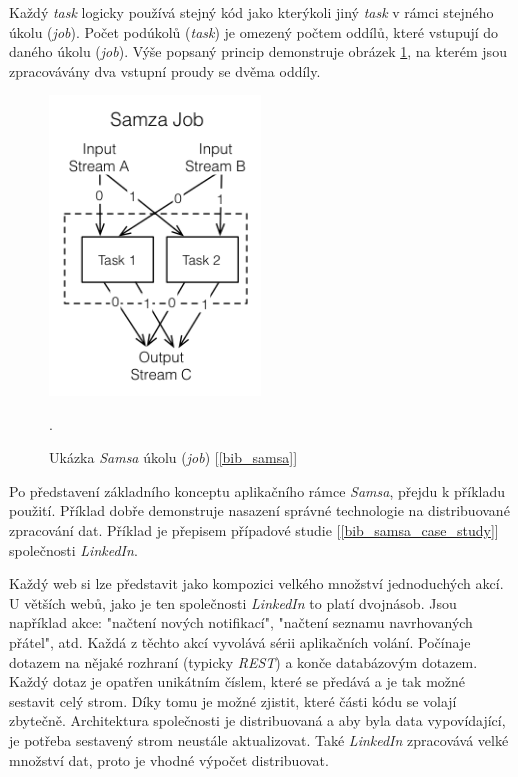 \documentclass[
  digital, %
  table,   %
  nolof,     %
  nolot,     %
  oneside, %
  nocover,
  monochrome,
  12pt
]{fithesis3}
\begin{document}
Každý \textit{task} logicky používá stejný kód jako kterýkoli jiný \textit{task} v rámci stejného úkolu (\textit{job}). Počet podúkolů (\textit{task}) je omezený počtem oddílů, které vstupují do daného úkolu (\textit{job}). Výše popsaný princip demonstruje obrázek \ref{fig:samsa-concept}, na kterém jsou zpracovávány dva vstupní proudy se dvěma oddíly.

\begin{figure}[H]
	\centering
    \includegraphics[width=0.5\textwidth, height=0.5\textheight]{images/samsa-job-detail.png}
    \caption{Ukázka \textit{Samsa} úkolu (\textit{job}) [\ref{bib_samsa}]}.
    \label{fig:samsa-concept}
\end{figure}

Po představení základního konceptu aplikačního rámce \textit{Samsa}, přejdu k příkladu použití. Příklad dobře demonstruje nasazení správné technologie na distribuované zpracování dat. Příklad je přepisem případové studie [\ref{bib_samsa_case_study}] společnosti \textit{LinkedIn}.

Každý web si lze představit jako kompozici velkého množství jednoduchých akcí. U větších webů, jako je ten společnosti \textit{LinkedIn} to platí dvojnásob. Jsou například akce: "načtení nových notifikací", "načtení seznamu navrhovaných přátel", atd. Každá z těchto akcí vyvolává sérii aplikačních volání. Počínaje dotazem na nějaké rozhraní (typicky \textit{REST}) a konče databázovým dotazem. Každý dotaz je opatřen unikátním číslem, které se předává a je tak možné sestavit celý strom. Díky tomu je možné zjistit, které části kódu se volají zbytečně. Architektura společnosti je distribuovaná a aby byla data vypovídající, je potřeba sestavený strom neustále aktualizovat. Také \textit{LinkedIn} zpracovává velké množství dat, proto je vhodné výpočet distribuovat.
\end{document}
